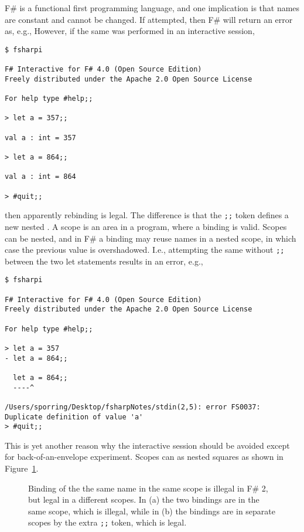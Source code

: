 F\# is a functional first programming language, and one implication is that names are constant and cannot be changed. If attempted, then F\# will return an error as, e.g.,
%
%
However, if the same was performed in an interactive session,
\begin{lstlisting}[language=console]
$ fsharpi

F# Interactive for F# 4.0 (Open Source Edition)
Freely distributed under the Apache 2.0 Open Source License

For help type #help;;

> let a = 357;;

val a : int = 357

> let a = 864;;

val a : int = 864

> #quit;;
\end{lstlisting}
then apparently rebinding is legal. The difference is that the \lstinline|;;| token defines a new nested . A scope is an area in a program, where a binding is valid. Scopes can be nested, and in F\# a binding may reuse names in a nested scope, in which case the previous value is overshadowed. I.e., attempting the same without \lstinline|;;| between the two let statements results in an error, e.g.,
\begin{lstlisting}[language=console]
$ fsharpi

F# Interactive for F# 4.0 (Open Source Edition)
Freely distributed under the Apache 2.0 Open Source License

For help type #help;;

> let a = 357
- let a = 864;;

  let a = 864;;
  ----^

/Users/sporring/Desktop/fsharpNotes/stdin(2,5): error FS0037: Duplicate definition of value 'a'
> #quit;;
\end{lstlisting}
This is yet another reason why the interactive session should be avoided except for back-of-an-envelope experiment.  Scopes can as nested squares as shown in Figure~\ref{fig:scope}.
\begin{figure}
  \centering
  \caption{Binding of the the same name in the same scope is illegal in F\# 2, but legal in a different scopes. In (a) the two bindings are in the same scope, which is illegal, while in (b) the bindings are in separate scopes by the extra \lstinline|;;| token, which is legal.}
  \label{fig:scope}
\end{figure}

